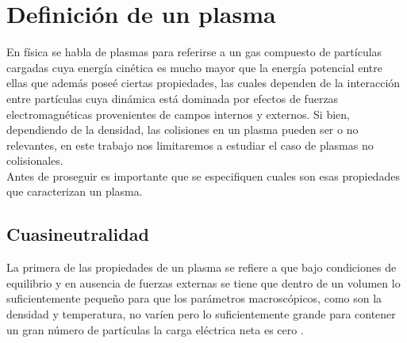 \documentclass[../tesis_main_file.tex]{subfiles}
\begin{document}
\section{Definición de un plasma}
En física se habla de plasmas para referirse a un gas compuesto de partículas cargadas cuya energía cinética es mucho mayor que la energía potencial entre ellas \cite{nicholson1983introduction} que además poseé ciertas propiedades, las cuales dependen de la interacción entre partículas cuya dinámica está dominada por efectos de fuerzas electromagnéticas provenientes de campos internos y externos.
Si bien, dependiendo de la densidad, las colisiones en un plasma pueden ser o no relevantes, en este trabajo nos limitaremos a estudiar el caso de plasmas no colisionales.\\
Antes de proseguir es importante que se especifiquen cuales son esas propiedades que caracterizan un plasma.
\subsection{Cuasineutralidad}
La primera de las propiedades de un plasma se refiere a que bajo condiciones de equilibrio y en ausencia de fuerzas externas se tiene que dentro de un volumen lo suficientemente pequeño para que los parámetros macroscópicos, como son la densidad y temperatura, no varíen pero lo suficientemente grande para contener un gran número de partículas la carga eléctrica neta es cero \cite{bittencourt2013fundamentals}.
\end{document}
